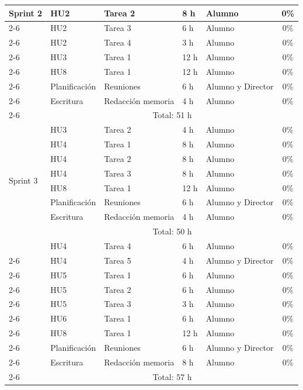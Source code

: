 \documentclass[
11pt, %
]{charter}
\begin{document}
\begin{longtable}{|l|l|p{3cm}|p{1cm}|p{2cm}|c|}
\multirow{9}{*}{Sprint 2} 
 & HU2 & Tarea 2 & 8 h & Alumno                       & 0\% \\ \cline{2-6} 
 & HU2 & Tarea 3 & 6 h & Alumno                       & 0\% \\ \cline{2-6}
 & HU2 & Tarea 4 & 3 h & Alumno                       & 0\% \\ \cline{2-6}
 & HU3 & Tarea 1 & 12 h & Alumno                       & 0\% \\ \cline{2-6} 
 & HU8 & Tarea 1 & 12 h & Alumno                       & 0\% \\ \cline{2-6}
 & Planificación & Reuniones & 6 h & Alumno y Director  & 0\% \\ \cline{2-6}
 & Escritura & Redacción memoria & 4 h & Alumno         & 0\% \\ \cline{2-6}
 & \multicolumn{5}{|c|}{Total: 51 h} \\ \hline \hline

\multirow{8}{*}{Sprint 3} 
 & HU3 & Tarea 2 & 4 h & Alumno                       & 0\% \\ \cline{2-6} 
 & HU4 & Tarea 1 & 8 h & Alumno                       & 0\% \\ \cline{2-6} 
 & HU4 & Tarea 2 & 8 h & Alumno                       & 0\% \\ \cline{2-6} 
 & HU4 & Tarea 3 & 8 h & Alumno                       & 0\% \\ \cline{2-6} 
 & HU8 & Tarea 1 & 12 h & Alumno                      & 0\% \\ \cline{2-6}
 & Planificación & Reuniones & 6 h & Alumno y Director  & 0\% \\ \cline{2-6}
 & Escritura & Redacción memoria & 4 h & Alumno         & 0\% \\ \cline{2-6}
 & \multicolumn{5}{|c|}{Total: 50 h} \\ \hline \hline

\pagebreak

\multirow{10}{*}{Sprint 4} 
 & HU4 & Tarea 4 & 6 h & Alumno                       & 0\% \\ \cline{2-6} 
 & HU4 & Tarea 5 & 4 h & Alumno y Director            & 0\% \\ \cline{2-6}
 & HU5 & Tarea 1 & 6 h & Alumno                       & 0\% \\ \cline{2-6}
 & HU5 & Tarea 2 & 6 h & Alumno                       & 0\% \\ \cline{2-6} 
 & HU5 & Tarea 3 & 3 h & Alumno                       & 0\% \\ \cline{2-6} 
 & HU6 & Tarea 1 & 6 h & Alumno                       & 0\% \\ \cline{2-6}
 & HU8 & Tarea 1 & 12 h & Alumno                       & 0\% \\ \cline{2-6}
 & Planificación & Reuniones & 6 h & Alumno y Director  & 0\% \\ \cline{2-6}
 & Escritura & Redacción memoria & 8 h & Alumno         & 0\% \\ \cline{2-6}
 & \multicolumn{5}{|c|}{Total: 57 h} \\ \hline \hline


\end{longtable}
\end{document}
